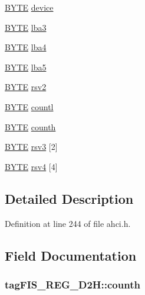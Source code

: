 \begin{DoxyCompactItemize}
\item 
\hyperlink{ahci_8h_aae9749d96e15ccb4f482dd5f55d98f9b}{B\+Y\+TE} \hyperlink{structtagFIS__REG__D2H_a5883a2c308799478f45650f859b84d5a}{device}
\item 
\hyperlink{ahci_8h_aae9749d96e15ccb4f482dd5f55d98f9b}{B\+Y\+TE} \hyperlink{structtagFIS__REG__D2H_a2400764e4e0ae987bd118dc9bdfb30a2}{lba3}
\item 
\hyperlink{ahci_8h_aae9749d96e15ccb4f482dd5f55d98f9b}{B\+Y\+TE} \hyperlink{structtagFIS__REG__D2H_ab48d0d414e9c4f94f000822135de8855}{lba4}
\item 
\hyperlink{ahci_8h_aae9749d96e15ccb4f482dd5f55d98f9b}{B\+Y\+TE} \hyperlink{structtagFIS__REG__D2H_a3b16e213c9e63150e859b42dbdb2b258}{lba5}
\item 
\hyperlink{ahci_8h_aae9749d96e15ccb4f482dd5f55d98f9b}{B\+Y\+TE} \hyperlink{structtagFIS__REG__D2H_a2339648b64663c0a6a523cfe97a9524b}{rsv2}
\item 
\hyperlink{ahci_8h_aae9749d96e15ccb4f482dd5f55d98f9b}{B\+Y\+TE} \hyperlink{structtagFIS__REG__D2H_a639815d27bc7a40407f38239cae41de7}{countl}
\item 
\hyperlink{ahci_8h_aae9749d96e15ccb4f482dd5f55d98f9b}{B\+Y\+TE} \hyperlink{structtagFIS__REG__D2H_ad7f0515658cd3bb40c8fff4a66f6064f}{counth}
\item 
\hyperlink{ahci_8h_aae9749d96e15ccb4f482dd5f55d98f9b}{B\+Y\+TE} \hyperlink{structtagFIS__REG__D2H_a7214f42d9e1ccfc908886ceb8d766db2}{rsv3} \mbox{[}2\mbox{]}
\item 
\hyperlink{ahci_8h_aae9749d96e15ccb4f482dd5f55d98f9b}{B\+Y\+TE} \hyperlink{structtagFIS__REG__D2H_a5695dd69336468b090aef20c7b58e98d}{rsv4} \mbox{[}4\mbox{]}
\end{DoxyCompactItemize}


\subsection{Detailed Description}


Definition at line 244 of file ahci.\+h.



\subsection{Field Documentation}
\subsubsection[{\texorpdfstring{counth}{counth}}]{ tag\+F\+I\+S\+\_\+\+R\+E\+G\+\_\+\+D2\+H\+::counth}\hypertarget{structtagFIS__REG__D2H_ad7f0515658cd3bb40c8fff4a66f6064f}{}\label{structtagFIS__REG__D2H_ad7f0515658cd3bb40c8fff4a66f6064f}


